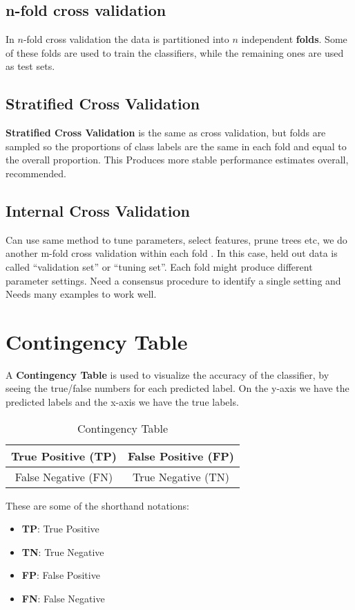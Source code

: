 \documentclass[12pt, a4paper]{book}
\begin{document}
\subsection{n-fold cross validation}
In $n$-fold cross validation the data is partitioned into $n$ independent \textbf{folds}. Some of these folds are used to train the classifiers, while the remaining ones are used as test sets.

\subsection{Stratified Cross Validation}
\textbf{Stratified Cross Validation} is the same as cross validation, but folds are sampled so the proportions of class labels are the same in each fold and equal to the overall proportion. This Produces more stable performance estimates overall, recommended.

\subsection{Internal Cross Validation}
Can use same method to tune parameters, select features, prune trees etc, we do another m-fold cross validation within each fold . In this case, held out data is called “validation set” or “tuning set”. Each fold might produce different parameter settings. Need a consensus procedure to identify a single setting and Needs many examples to work well.

\section{Contingency Table}
A \textbf{Contingency Table} is used to visualize the accuracy of the classifier, by seeing the true/false numbers for each predicted label. On the y-axis we have the predicted labels and the x-axis we have the true labels.
\begin{table*}[ht]
    \centering
\caption{Contingency Table}
\label{tab:my_label}
    \begin{tabular}
    {|c|c|} \hline 
         True Positive (TP)& False Positive (FP)\\ \hline 
         False Negative (FN)& True Negative (TN)\\ \hline
    \end{tabular}
\end{table*}
These are some of the shorthand notations:
\begin{itemize}
    \item \textbf{TP}: True Positive
    \item \textbf{TN}: True Negative
    \item \textbf{FP}: False Positive
    \item \textbf{FN}: False Negative
\end{itemize}
\end{document}
